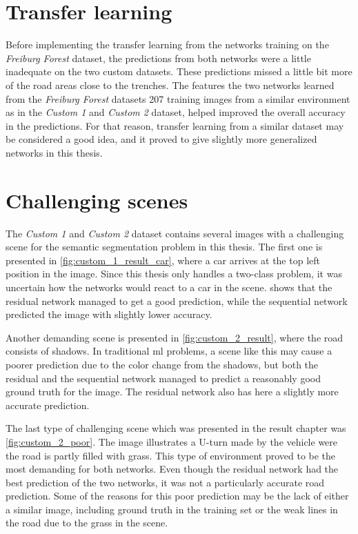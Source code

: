 \documentclass[USenglish]{ifimaster}  %
\begin{document}
\section{Transfer learning}
Before implementing the transfer learning from the networks training on the \textit{Freiburg Forest} dataset, the predictions from both networks were a little inadequate on the two custom datasets. These predictions missed a little bit more of the road areas close to the trenches. The features the two networks learned from the \textit{Freiburg Forest} datasets 207 training images from a similar environment as in the \textit{Custom 1} and \textit{Custom 2} dataset, helped improved the overall accuracy in the predictions. For that reason, transfer learning from a similar dataset may be considered a good idea, and it proved to give slightly more generalized networks in this thesis.  

\section{Challenging scenes}
The \textit{Custom 1} and \textit{Custom 2} dataset contains several images with a challenging scene for the semantic segmentation problem in this thesis. The first one is presented in \cref{fig:custom_1_result_car}, where a car arrives at the top left position in the image. Since this thesis only handles a two-class problem, it was uncertain how the networks would react to a car in the scene.  shows that the residual network managed to get a good prediction, while the sequential network predicted the image with slightly lower accuracy.

Another demanding scene is presented in \cref{fig:custom_2_result}, where the road consists of shadows. In traditional \ac{ml} problems, a scene like this may cause a poorer prediction due to the color change from the shadows, but both the residual and the sequential network managed to predict a reasonably good ground truth for the image. The residual network also has here a slightly more accurate prediction.

The last type of challenging scene which was presented in the result chapter was \cref{fig:custom_2_poor}. The image illustrates a U-turn made by the vehicle were the road is partly filled with grass. This type of environment proved to be the most demanding for both networks. Even though the residual network had the best prediction of the two networks, it was not a particularly accurate road prediction. Some of the reasons for this poor prediction may be the lack of either a similar image, including ground truth in the training set or the weak lines in the road due to the grass in the scene. 
\end{document}
